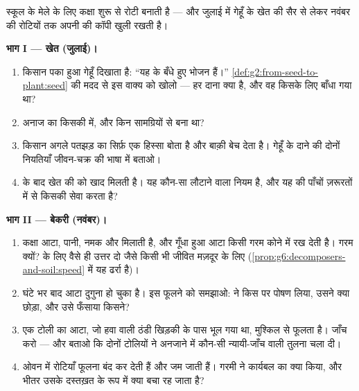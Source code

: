 \begin{problem}[{सप्ताहांत समस्या --- रोटी का एक बैच, बीज से टुकड़े तक
पीछा किया हुआ}]\label{pb:g6:producing-our-food:1}
स्कूल के मेले के लिए कक्षा शुरू से रोटी बनाती है --- और जुलाई में गेहूँ
के खेत की सैर से लेकर नवंबर की रोटियों तक अपनी  की कॉपी खुली
रखती है।

\medskip\noindent\textbf{भाग I --- खेत (जुलाई)।}
\begin{enumerate}
  \item किसान पका हुआ गेहूँ दिखाता है: ``यह   के बँधे हुए भोजन
        हैं।'' \cref{def:g2:from-seed-to-plant:seed} की मदद से इस
        वाक्य को खोलो --- हर दाना क्या है, और वह किसके लिए बाँधा गया
        था?
  \item अनाज का  किसकी  में, और किन सामग्रियों
        से बना था?
  \item किसान अगले पतझड़  का सिर्फ़ एक हिस्सा बोता है और बाक़ी बेच
        देता है। गेहूँ के दाने की दोनों नियतियाँ जीवन-चक्र की भाषा में
        बताओ।
  \item {} के बाद खेत की  को खाद मिलती है। यह कौन-सा लौटाने
        वाला नियम है, और यह  की पाँचों ज़रूरतों में से किसकी सेवा
        करता है?
\end{enumerate}

\medskip\noindent\textbf{भाग II --- बेकरी (नवंबर)।}
\begin{enumerate}[resume]
  \item कक्षा आटा, पानी, नमक और  मिलाती है, और गूँधा हुआ आटा किसी
        गरम कोने में रख देती है। गरम क्यों?  के लिए वैसे ही उत्तर
        दो जैसे किसी भी जीवित मज़दूर के लिए
        (\cref{prop:g6:decomposers-and-soil:speed} में यह ढर्रा है)।
  \item घंटे भर बाद आटा दुगुना हो चुका है। इस फूलने को समझाओ:  ने
        किस पर पोषण लिया, उसने क्या छोड़ा, और उसे फँसाया किसने?
  \item एक टोली का आटा, जो हवा वाली ठंडी खिड़की के पास भूल गया था,
        मुश्किल से फूलता है। जाँच करो --- और बताओ कि दोनों टोलियों ने
        अनजाने में कौन-सी न्यायी-जाँच वाली तुलना चला दी।
  \item ओवन में रोटियाँ फूलना बंद कर देती हैं और जम जाती हैं। गरमी ने
        कार्यबल का क्या किया, और भीतर उसके दस्तख़त के रूप में क्या बचा
        रह जाता है?
\end{enumerate}


\end{problem}
